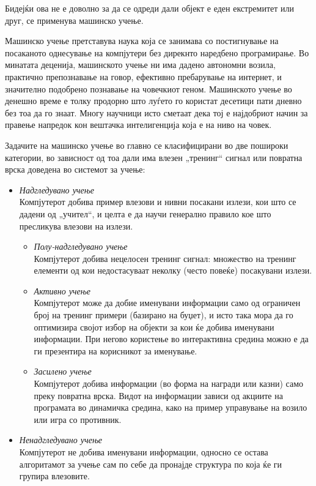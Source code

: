 \documentclass[12pt]{article}
\begin{document}
  Бидејќи ова не е доволно за да се одреди дали објект е еден екстремитет или друг, се применува машинско учење.

	Машинско учење претставува наука која се занимава со постигнување на посаканото однесување на компјутери без дирекнто наредбено програмирање. Во минатата деценија, машинското учење ни има дадено автономни возила, практично препознавање на говор, ефективно пребарување на интернет, и значително подобрено познавање на човечкиот геном. Машинското учење во денешно време е толку продорно што луѓето го користат десетици пати дневно без тоа да го знаат. Многу научници исто сметаат дека тој е најдобриот начин за правење напредок кон вештачка интелигенција која е на ниво на човек.

	Задачите на машинско учење во главно се класифицирани во две пошироки категории, во зависност од тоа дали има влезен „тренинг“ сигнал или повратна врска доведена во системот за учење:

	\begin{itemize}
		\item \textit{Надгледувано учење}\\Компјутерот добива пример влезови и нивни посакани излези, кои што се дадени од „учител“, и целта е да научи генерално правило кое што пресликува влезови на излези.
    \begin{itemize}
      \item \textit{Полу-надгледувано учење}\\Компјутерот добива нецелосен тренинг сигнал: множество на тренинг елементи од кои недостасуваат неколку (често повеќе) посакувани излези.
      \item \textit{Активно учење}\\Компјутерот може да добие именувани информации само од ограничен број на тренинг примери (базирано на буџет), и исто така мора да го оптимизира својот избор на објекти за кои ќе добива именувани информации. При негово користење во интерактивна средина можно е да ги презентира на корисникот за именување.
      \item \textit{Засилено учење}\\Компјутерот добива информации (во форма на награди или казни) само преку повратна врска. Видот на информации зависи од акциите на програмата во динамичка средина, како на пример управување на возило или игра со противник.
      \end{itemize}
		\item \textit{Ненадгледувано учење}\\Компјутерот не добива именувани информации, односно се остава алгоритамот за учење сам по себе да пронајде структура по која ќе ги групира влезовите.
    \end{itemize}
\end{document}
